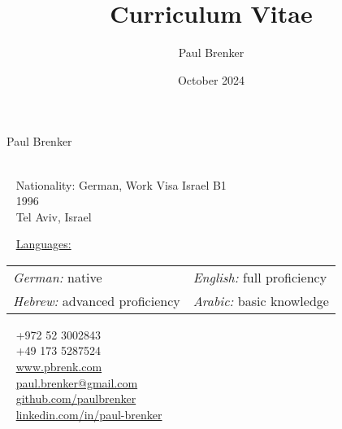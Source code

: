 \documentclass{style/modernsimplecv}
\title{Curriculum Vitae}
\author{Paul Brenker}
\date{October 2024}
\begin{document}
\thispagestyle{empty}

\begin{minipage}[t]{0.99\textwidth} %
    \vspace{0pt}
    \begin{shaded*}
        \begin{minipage}[t]{0.44\textwidth}
            \vspace{0pt}
            {\par\centering\huge{Paul Brenker}} \\[0.3cm]
            \faGlobe~ Nationality: German, Work Visa Israel B1\\
            \faBirthdayCake~ 1996 \\
            \faMapMarker~ Tel Aviv, Israel \\
            \begin{spacing}{0.5}
                {
                    \faCommentsO~ \underline{Languages:} \\
                    \begin{tabular}{l l}
                        \emph{German:} native & \emph{English:} full proficiency \\
                        \emph{Hebrew:} advanced proficiency & \emph{Arabic:} basic knowledge \\ 
                    \end{tabular}
                }
            \end{spacing}
            \vspace{4pt}
        \end{minipage}\hfill
        \begin{minipage}[t]{0.39\textwidth}
            \vspace{29pt} 
            \faPhone~ +972 52 3002843 \\
            \faPhone~ +49 173 5287524 \\

            \faLink~ \protect\url{www.pbrenk.com}\\
            \faAt~ \protect\url{paul.brenker@gmail.com} \\
            \faGithub~ \protect\url{github.com/paulbrenker} \\
            \faLinkedin~ \protect\url{linkedin.com/in/paul-brenker}\\
        \end{minipage}
        \hfill
    \end{shaded*}
\end{minipage}\\
\end{document}
